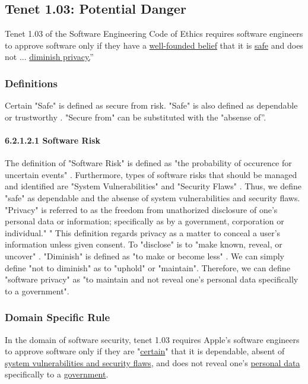 \subsection{Tenet 1.03: Potential Danger}
Tenet 1.03 of the Software Engineering Code of Ethics requires software engineers to approve software only if they have a \uline{well-founded belief} that it is \uline{safe} and does not ... \uline{diminish privacy.}'' \cite{code} 

\subsubsection{Definitions}
Certain
"Safe" is defined as secure from risk. \cite{define-safe} "Safe" is also defined as dependable or trustworthy \cite{define-safe2}. 
"Secure from" can be substituted with the "absense of''.
\paragraph{6.2.1.2.1 Software Risk}
The definition of "Software Risk" is defined  as "the probability of occurence for uncertain events" \cite{define-software-risk}. Furthermore, types of software risks that should be managed and identified are "System Vulnerabilities" and "Security Flaws" \cite{define-software-risk}.
Thus, we define "safe" as dependable and the absense of system vulnerabilities and security flaws.
"Privacy" is referred to as the freedom from unathorized disclosure of one's personal data or information; specifically as by a government, corporation or individual." \cite{define-privacy}" This definition regards privacy as a matter to conceal a user's information unless given consent. To "disclose" is to "make known, reveal, or uncover" \cite{define-disclose}. "Diminish" is defined as "to make or become less" \cite{define-diminish}. We can simply define "not to diminish" as to "uphold" or "maintain". Therefore, we can define "software privacy" as "to maintain and not reveal one's personal data specifically to a government".

\subsubsection{Domain Specific Rule}
In the domain of software security, tenet 1.03 requires Apple's software engineers to approve software only if they are "\uline{certain}" that it is dependable, absent of \uline{system vulnerabilities and security flaws}, and does not reveal one's \uline{personal data} specifically to a \uline{government}.




















